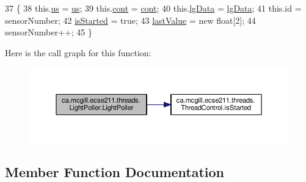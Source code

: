 \begin{DoxyCode}
37                                                                                                        \{
38     this.\hyperlink{classca_1_1mcgill_1_1ecse211_1_1threads_1_1_light_poller_ab6a9cb770bbf71f586697633db1475ff}{us} = \hyperlink{classca_1_1mcgill_1_1ecse211_1_1threads_1_1_light_poller_ab6a9cb770bbf71f586697633db1475ff}{us};
39     this.\hyperlink{classca_1_1mcgill_1_1ecse211_1_1threads_1_1_light_poller_ab6a9050ced4f6940add4735c8872194a}{cont} = \hyperlink{classca_1_1mcgill_1_1ecse211_1_1threads_1_1_light_poller_ab6a9050ced4f6940add4735c8872194a}{cont};
40     this.\hyperlink{classca_1_1mcgill_1_1ecse211_1_1threads_1_1_light_poller_a6cf53aecc3efc481f71d36341d2276c6}{lgData} = \hyperlink{classca_1_1mcgill_1_1ecse211_1_1threads_1_1_light_poller_a6cf53aecc3efc481f71d36341d2276c6}{lgData};
41     this.\textcolor{keywordtype}{id} = sensorNumber;
42     \hyperlink{classca_1_1mcgill_1_1ecse211_1_1threads_1_1_thread_control_a92f4933511db42476e39956246bcf2fe}{isStarted} = \textcolor{keyword}{true};
43     \hyperlink{classca_1_1mcgill_1_1ecse211_1_1threads_1_1_light_poller_a79908bf56395ae82ab5ac57b5b40f206}{lastValue} = \textcolor{keyword}{new} \textcolor{keywordtype}{float}[2];
44     sensorNumber++;
45   \}
\end{DoxyCode}
Here is the call graph for this function\+:\nopagebreak
\begin{figure}[H]
\begin{center}
\leavevmode
\includegraphics[width=350pt]{classca_1_1mcgill_1_1ecse211_1_1threads_1_1_light_poller_adc07f842a1cc089195c5e47c2a0e5ee6_cgraph}
\end{center}
\end{figure}


\subsection{Member Function Documentation}
\mbox{\label{classca_1_1mcgill_1_1ecse211_1_1threads_1_1_light_poller_aab90a460a4d0c926fb8f3930492a8fb1}} 
